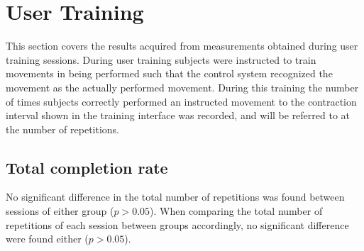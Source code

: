 
\section{User Training} \label{sec:R:userTraining}
This section covers the results acquired from measurements obtained during user training sessions. During user training subjects were instructed to train movements in being performed such that the control system recognized the movement as the actually performed movement. During this training the number of times subjects correctly performed an instructed movement to the contraction interval shown in the training interface was recorded, and will be referred to at the number of repetitions.

\subsection{Total completion rate}
No significant difference in the total number of repetitions was found between sessions of either group ($p > 0.05$). When comparing the total number of repetitions of each session between groups accordingly, no significant difference were found either ($p > 0.05$).
%

